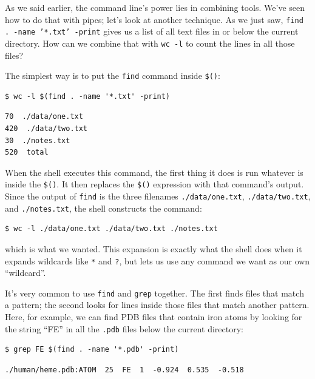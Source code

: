 \documentclass{book}
\begin{document}
As we said earlier, the command line's power lies in combining tools.
We've seen how to do that with pipes; let's look at another technique.
As we just saw, \texttt{find . -name '*.txt' -print} gives us a list of
all text files in or below the current directory. How can we combine
that with \texttt{wc -l} to count the lines in all those files?

The simplest way is to put the \texttt{find} command inside
\texttt{\$()}:

\begin{verbatim}
$ wc -l $(find . -name '*.txt' -print)
\end{verbatim}

\begin{verbatim}
70  ./data/one.txt
420  ./data/two.txt
30  ./notes.txt
520  total
\end{verbatim}

When the shell executes this command, the first thing it does is run
whatever is inside the \texttt{\$()}. It then replaces the \texttt{\$()}
expression with that command's output. Since the output of \texttt{find}
is the three filenames \texttt{./data/one.txt}, \texttt{./data/two.txt},
and \texttt{./notes.txt}, the shell constructs the command:

\begin{verbatim}
$ wc -l ./data/one.txt ./data/two.txt ./notes.txt
\end{verbatim}

which is what we wanted. This expansion is exactly what the shell does
when it expands wildcards like \texttt{*} and \texttt{?}, but lets us
use any command we want as our own ``wildcard''.

It's very common to use \texttt{find} and \texttt{grep} together. The
first finds files that match a pattern; the second looks for lines
inside those files that match another pattern. Here, for example, we can
find PDB files that contain iron atoms by looking for the string ``FE''
in all the \texttt{.pdb} files below the current directory:

\begin{verbatim}
$ grep FE $(find . -name '*.pdb' -print)
\end{verbatim}

\begin{verbatim}
./human/heme.pdb:ATOM  25  FE  1  -0.924  0.535  -0.518
\end{verbatim}
\end{document}
